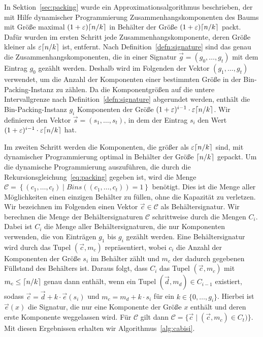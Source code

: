 In Sektion~\ref{sec:packing} wurde ein Approximationsalgorithmus beschrieben, der mit Hilfe dynamischer Programmierung Zusammenhangskomponenten des Baums mit Größe maximal $(1+\varepsilon)\lceil n/k\rceil$ in Behälter der Größe $(1+\varepsilon)\lceil n/k\rceil$ packt.
Dafür wurden im ersten Schritt jede Zusammenhangskomponente, deren Größe kleiner als $\varepsilon \lceil n/k\rceil$ ist, entfernt.
Nach Definition~\ref{defn:signature} sind das genau die Zusammenhangskomponenten, die in einer Signatur $\vec{g} = (g_0, \ldots, g_t)$ mit dem Eintrag $g_0$ gezählt werden.
Deshalb wird im Folgenden der Vektor $(g_1, \ldots, g_t)$ verwendet, um die Anzahl der Komponenten einer bestimmten Größe in der Bin-Packing-Instanz zu zählen.
Da die Komponentgrößen auf die untere Intervallgrenze nach Definition~\ref{defn:signature} abgerundet werden, enthält die Bin-Packing-Instanz $g_i$ Komponenten der Größe $(1+\varepsilon)^{i-1} \cdot \varepsilon \lceil n/k\rceil$.
Wir definieren den Vektor $\vec{s} = (s_1, \ldots, s_t)$, in dem der Eintrag $s_i$ den Wert $(1+\varepsilon)^{i-1} \cdot \varepsilon \lceil n/k\rceil$ hat.

Im zweiten Schritt werden die Komponenten, die größer als $\varepsilon \lceil n/k\rceil$ sind, mit dynamischer Programmierung optimal in Behälter der Größe $\lceil n/k\rceil$ gepackt.
Um die dynamische Programmierung auszuführen, die durch die Rekursionsgleichung~\eqref{eq:packing} gegeben ist, wird die Menge $\mathcal{C} = \left\{ (c_1, \ldots, c_t) \mid Bins((c_1, \ldots, c_t)) = 1 \right\}$ benötigt.
Dies ist die Menge aller Möglichkeiten einen einzigen Behälter zu füllen, ohne die Kapazität zu verletzen.
Wir bezeichnen im Folgenden einen Vektor $\vec{c} \in \mathcal{C}$ als Behältersignatur.
Wir berechnen die Menge der Behältersignaturen $\mathcal{C}$ schrittweise durch die Mengen $C_i$.
Dabei ist $C_i$ die Menge aller Behältersignaturen, die nur Komponenten verwenden, die von Einträgen $g_1$ bis $g_i$ gezählt werden.
Eine Behältersignatur wird durch das Tupel $(\vec{c}, m_c)$ repräsentiert, wobei $c_i$ die Anzahl der Komponenten der Größe $s_i$ im Behälter zählt und $m_c$ der dadurch gegebenen Füllstand des Behälters ist.
Daraus folgt, dass $C_i$ das Tupel $(\vec{c}, m_c)$ mit $m_c \leq \lceil n/k\rceil$ genau dann enthält, wenn ein Tupel $(\vec{d}, m_d) \in C_{i-1}$ existiert, sodass $\vec{c} = \vec{d} + k \cdot \vec{e}(s_i)$ und $m_c = m_d + k \cdot s_i$ für ein $k \in \{0, \ldots, g_i\}$.
Hierbei ist $\vec{e}(x)$ die Signatur, die nur eine Komponente der Größe $x$ enthält und deren erste Komponente weggelassen wird.
Für $\mathcal{C}$ gilt dann $\mathcal{C} = \{ \vec{c} \mid (\vec{c}, m_c) \in C_t)\}$.
Mit diesen Ergebnissen erhalten wir Algorithmus~\ref{alg:cabisi}.

